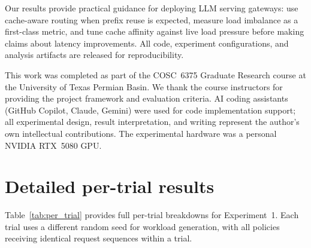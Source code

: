 \documentclass{article}
\begin{document}
Our results provide practical guidance for deploying LLM serving gateways: use cache-aware routing when prefix reuse is expected, measure load imbalance as a first-class metric, and tune cache affinity against live load pressure before making claims about latency improvements. All code, experiment configurations, and analysis artifacts are released for reproducibility.

\begin{ack}
This work was completed as part of the COSC~6375 Graduate Research course at the University of Texas Permian Basin. We thank the course instructors for providing the project framework and evaluation criteria. AI coding assistants (GitHub Copilot, Claude, Gemini) were used for code implementation support; all experimental design, result interpretation, and writing represent the author's own intellectual contributions. The experimental hardware was a personal NVIDIA RTX~5080 GPU.
\end{ack}




\appendix

\section{Detailed per-trial results}
\label{app:per_trial}

Table~\ref{tab:per_trial} provides full per-trial breakdowns for Experiment~1. Each trial uses a different random seed for workload generation, with all policies receiving identical request sequences within a trial.
\end{document}
